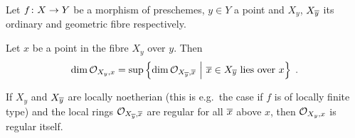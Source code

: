 \documentclass[a4paper,parskip=half,numbers=enddot, DIV=12]{scrreprt}
\begin{document}
\begin{prop}
	Let $f\colon X\morphism Y$ be a morphism of preschemes, $y\in Y$ a point and $X_y$, $X_{\overline{y}}$ its ordinary and geometric fibre respectively.
	\begin{alphanumerate}
		\item Let $x$ be a point in the fibre $X_y$ over $y$. Then
		\begin{align*}
			\dim\mathcal{O}_{X_y,x}=\sup\left\{\dim\mathcal{O}_{X_{\overline{y}},\overline{x}}\ \middle|\  \overline{x}\in X_{\overline{y}}\text{ lies over }x\right\}\;.
		\end{align*}
		\item If $X_y$ and $X_{\overline{y}}$ are locally noetherian (this is e.g.\ the case if $f$ is of locally finite type) and the local rings $\mathcal{O}_{X_{\overline{y}},\overline{x}}$ are regular for all $\overline{x}$ above $x$, then $\mathcal{O}_{X_y,x}$ is regular itself.
	\end{alphanumerate}
\end{prop}
\end{document}
